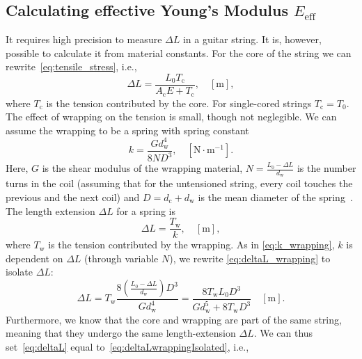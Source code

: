\documentclass{article}
\begin{document}
\begin{sloppy}
\subsection{Calculating effective Young's Modulus $E_\text{eff}$}%
%
It requires high precision to measure $\Delta L$ in a guitar string. It is, however, possible to calculate it from material constants. For the core of the string we can rewrite~\eqref{eq:tensile_stress}, i.e.,
%
\begin{equation}\label{eq:deltaL}
    \Delta L= \frac{L_0T_\text{c}}{A_\text{c}E + T_\text{c}}, \quad  [\text{m}], 
\end{equation}
%
where $T_\text{c}$ is the tension contributed by the core. For single-cored strings $T_\text{c} = T_0$.
%
The effect of wrapping on the tension is small, though not neglegible. We can assume the wrapping to be a spring with spring constant~\cite{childs:mechanical_engineering}
%
\begin{equation}\label{eq:k_wrapping}
    k = \frac{Gd_\text{w}^4}{8ND^3}, \quad [\text{N}\cdot\text{m}^{-1}].
\end{equation}
%
Here, $G$ is the shear modulus of the wrapping material, $N = \frac{L_0 - \Delta L}{d_\text{w}}$ is the number turns in the coil (assuming that for the untensioned string, every coil touches the previous and the next coil) and $D = d_\text{c}+d_\text{w}$ is the mean diameter of the spring~\cite{kemp:wound_and_unwound_strings}.
%
The length extension $\Delta L$ for a spring is
%
\begin{equation}\label{eq:deltaL_wrapping}
    \Delta L = \frac{T_\text{w}}{k}, \quad [\text{m}],
\end{equation}
%
where $T_\text{w}$ is the tension contributed by the wrapping. As in \eqref{eq:k_wrapping}, $k$ is dependent on $\Delta L$ (through variable $N$), we rewrite  \eqref{eq:deltaL_wrapping} to isolate $\Delta L$:
\begin{equation}\label{eq:deltaLwrappingIsolated}
    \Delta L = T_\text{w}\frac{8(\frac{L_0 - \Delta L}{d_\text{w}})D^3}{Gd_\text{w}^4} = \frac{8T_\text{w}L_0D^3}{Gd_\text{w}^5 + 8T_\text{w}D^3} \quad [\text{m}].
\end{equation}
Furthermore, we know that the core and wrapping are part of the same string, meaning that they undergo the same length-extension $\Delta L$. We can thus set~\eqref{eq:deltaL} equal to~\eqref{eq:deltaLwrappingIsolated}, i.e., 

\end{sloppy}
\end{document}
